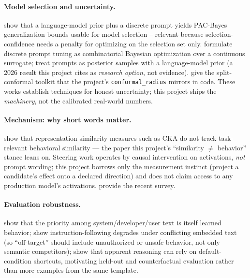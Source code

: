 \paragraph{Model selection and uncertainty.}
\citet{akinwande2023pacbayes} show that a language-model prior plus a discrete
prompt yields PAC-Bayes generalization bounds usable for model selection --
relevant because selection-confidence needs a penalty for optimizing on the
selection set only. \citet{sabbatella2023bayesprompt} formulate discrete prompt
tuning as combinatorial Bayesian optimization over a continuous surrogate;
\citet{zhou2026bayespo} treat prompts as posterior samples with a language-model
prior (a 2026 result this project cites as \emph{research option}, not evidence).
\citet{angelopoulos2021conformal} give the split-conformal toolkit that the
project's \texttt{conformal\_radius} mirrors in code. These works establish
techniques for honest uncertainty; this project ships the \emph{machinery}, not
the calibrated real-world numbers.

\paragraph{Mechanism: why short words matter.}
\citet{kornblith2019similarity} show that representation-similarity measures such
as CKA do not track task-relevant behavioral similarity --- the paper this
project's ``similarity $\neq$ behavior'' stance leans on. Steering work
\citep{turner2023activation,li2023iti,zou2023repe,panickssery2023caa,meng2022rome}
operates by causal intervention on activations, \emph{not} prompt wording; this
project borrows only the measurement instinct (project a candidate's effect onto
a declared direction) and does not claim access to any production model's
activations. \citet{bartoszcze2025repe} provide the recent survey.

\paragraph{Evaluation robustness.}
\citet{wallace2024instructionhierarchy} show that the priority among
system/developer/user text is itself learned behavior; \citet{li2023promptinj}
show instruction-following degrades under conflicting embedded text (so
``off-target'' should include unauthorized or unsafe behavior, not only semantic
competitors); \citet{wu2023counterfactual} show that apparent reasoning can rely
on default-condition shortcuts, motivating held-out and counterfactual
evaluation rather than more examples from the same template.

